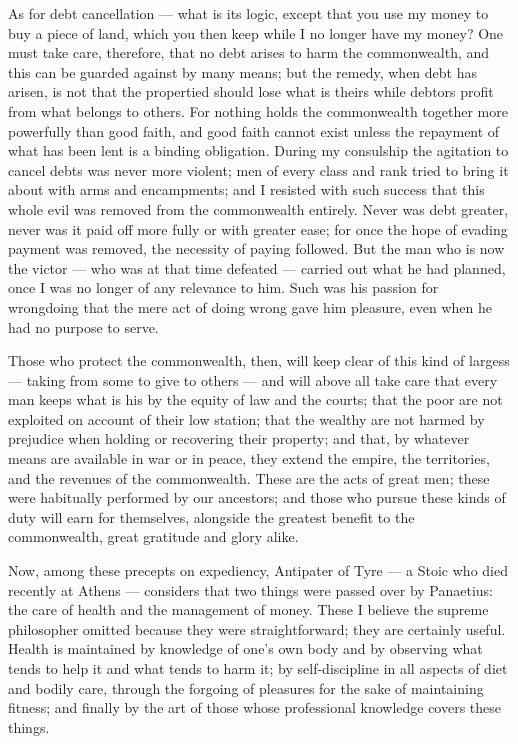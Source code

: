 As for debt cancellation — what is its logic, except that you use my money to buy a piece of land, which you then keep while I no longer have my money? One must take care, therefore, that no debt arises to harm the commonwealth, and this can be guarded against by many means; but the remedy, when debt has arisen, is not that the propertied should lose what is theirs while debtors profit from what belongs to others. For nothing holds the commonwealth together more powerfully than good faith, and good faith cannot exist unless the repayment of what has been lent is a binding obligation. During my consulship the agitation to cancel debts was never more violent; men of every class and rank tried to bring it about with arms and encampments; and I resisted with such success that this whole evil was removed from the commonwealth entirely. Never was debt greater, never was it paid off more fully or with greater ease; for once the hope of evading payment was removed, the necessity of paying followed. But the man who is now the victor — who was at that time defeated — carried out what he had planned, once I was no longer of any relevance to him. Such was his passion for wrongdoing that the mere act of doing wrong gave him pleasure, even when he had no purpose to serve.

 Those who protect the commonwealth, then, will keep clear of this kind of largess — taking from some to give to others — and will above all take care that every man keeps what is his by the equity of law and the courts; that the poor are not exploited on account of their low station; that the wealthy are not harmed by prejudice when holding or recovering their property; and that, by whatever means are available in war or in peace, they extend the empire, the territories, and the revenues of the commonwealth. These are the acts of great men; these were habitually performed by our ancestors; and those who pursue these kinds of duty will earn for themselves, alongside the greatest benefit to the commonwealth, great gratitude and glory alike.

 Now, among these precepts on expediency, Antipater of Tyre — a Stoic who died recently at Athens — considers that two things were passed over by Panaetius: the care of health and the management of money. These I believe the supreme philosopher omitted because they were straightforward; they are certainly useful. Health is maintained by knowledge of one's own body and by observing what tends to help it and what tends to harm it; by self-discipline in all aspects of diet and bodily care, through the forgoing of pleasures for the sake of maintaining fitness; and finally by the art of those whose professional knowledge covers these things.

